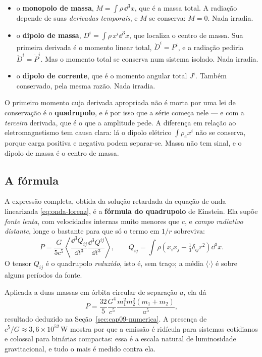 \documentclass[12pt,a4paper,oneside]{book}
\theoremstyle{rgplain}
\theoremstyle{rgremark}
\begin{document}
\begin{itemize}
  \item o \textbf{monopolo de massa}, $M=\int\rho\,\dd^3x$, que é a massa
  total. A radiação depende de suas \emph{derivadas temporais}, e $M$ se
  conserva: $\dot M=0$. Nada irradia.

  \item o \textbf{dipolo de massa}, $D^i=\int\rho\,x^i\dd^3x$, que localiza o
  centro de massa. Sua primeira derivada é o momento linear total,
  $\dot D^i=P^i$, e a radiação pediria $\ddot D^i=\dot P^i$. Mas o momento
  total se conserva num sistema isolado. Nada irradia.

  \item o \textbf{dipolo de corrente}, que é o momento angular total
  $J^i$. Também conservado, pela mesma razão. Nada irradia.
\end{itemize}

O primeiro momento cuja derivada apropriada não é morta por uma lei de
conservação é o \textbf{quadrupolo}, e é por isso que a série começa nele ---
e com a \emph{terceira} derivada, que é o que a amplitude pede. A diferença
em relação ao eletromagnetismo tem causa clara: lá o dipolo elétrico
$\int\rho_e x^i$ não se conserva, porque carga positiva e negativa podem
separar-se. Massa não tem sinal, e o dipolo de massa é o centro de massa.

\subsection*{A fórmula}

A expressão completa, obtida da solução retardada da equação de onda
linearizada \eqref{eq:onda-lorenz}, é a \textbf{fórmula do quadrupolo} de
Einstein. Ela supõe \emph{fonte lenta}, com velocidades internas muito
menores que $c$, e \emph{campo radiativo distante}, longe o bastante para que
só o termo em $1/r$ sobreviva:
\begin{equation}
  P=\frac{G}{5c^5}
  \left\langle \frac{\dd^3 Q_{ij}}{\dd t^3}\frac{\dd^3 Q^{ij}}{\dd t^3}\right\rangle,
  \qquad
  Q_{ij}=\int\rho\left(x_ix_j-\tfrac13\delta_{ij}r^2\right)\dd^3x .
  \label{eq:quadrupolo}
\end{equation}
O tensor $Q_{ij}$ é o quadrupolo \emph{reduzido}, isto é, sem traço; a média
$\langle\cdot\rangle$ é sobre alguns períodos da fonte.

Aplicada a duas massas em órbita circular de separação $a$, ela dá
\begin{equation}
  P=\frac{32}{5}\frac{G^4}{c^5}\frac{m_1^2m_2^2(m_1+m_2)}{a^5},
  \label{eq:quadrupolo-binaria}
\end{equation}
resultado deduzido na Seção~\ref{sec:cap09-numerica}. A presença de
$c^5/G\approx3{,}6\times10^{52}\,$W mostra por que a emissão é ridícula para
sistemas cotidianos e colossal para binárias compactas: essa é a escala
natural de luminosidade gravitacional, e tudo o mais é medido contra ela.
\end{document}

